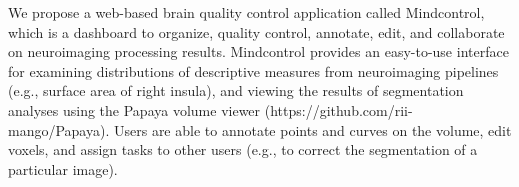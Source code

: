 We propose a web-based brain quality control application called Mindcontrol, which is a dashboard to organize, quality control, annotate, edit, and collaborate on neuroimaging processing results. Mindcontrol provides an easy-to-use interface for examining distributions of descriptive measures from neuroimaging pipelines (e.g., surface area of right insula), and viewing the results of segmentation analyses using the Papaya volume viewer (https://github.com/rii-mango/Papaya). Users are able to annotate points and curves on the volume, edit voxels, and assign tasks to other users (e.g., to correct the segmentation of a particular image). 

